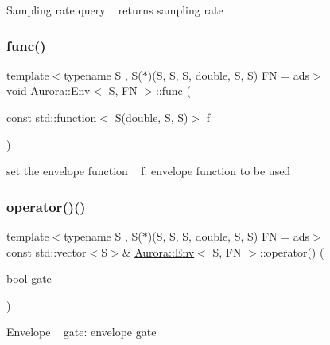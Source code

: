 Sampling rate query ~\newline
returns sampling rate \mbox{\label{class_aurora_1_1_env_a92aec91bb78127cf50d5d841870cce14}} 
\subsubsection{\texorpdfstring{func()}{func()}}
{\footnotesize\ttfamily template$<$typename S , S($\ast$)(\+S, S, S, double, S, S) FN = ads$>$ \\
void \hyperlink{class_aurora_1_1_env}{Aurora\+::\+Env}$<$ S, FN $>$\+::func (\begin{DoxyParamCaption}\item[{const std\+::function$<$ S(double, S, S)$>$}]{f }\end{DoxyParamCaption})\hspace{0.3cm}{\ttfamily [inline]}}

set the envelope function ~\newline
f\+: envelope function to be used \mbox{\label{class_aurora_1_1_env_ae4e2dec694f0be0f0efa5b073a06fef5}} 
\subsubsection{\texorpdfstring{operator()()}{operator()()}\hspace{0.1cm}{\footnotesize\ttfamily [1/3]}}
{\footnotesize\ttfamily template$<$typename S , S($\ast$)(\+S, S, S, double, S, S) FN = ads$>$ \\
const std\+::vector$<$S$>$\& \hyperlink{class_aurora_1_1_env}{Aurora\+::\+Env}$<$ S, FN $>$\+::operator() (\begin{DoxyParamCaption}\item[{bool}]{gate }\end{DoxyParamCaption})\hspace{0.3cm}{\ttfamily [inline]}}

Envelope ~\newline
gate\+: envelope gate \mbox{\label{class_aurora_1_1_env_a664e3c6ce7e66de66305ab220c116792}} 
